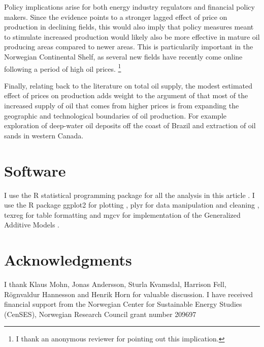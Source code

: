 \documentclass[12pt]{article}
\begin{document}
Policy implications arise for both energy industry regulators and financial policy makers. Since the evidence points to a stronger lagged effect of price on production in declining fields, this would also imply that policy measures meant to stimulate increased production would likely also be more effective in mature oil producing areas compared to newer areas. This is particularily important in the Norwegian Continental Shelf, as several new fields have recently come online following a period of high oil prices. \footnote{I thank an anonymous reviewer for pointing out this implication.}

Finally, relating back to the literature on total oil supply, the modest estimated effect of prices on production adds weight to the argument of \citet{hamilton_oil_2012} that most of the increased supply of oil that comes from higher prices is from expanding the geographic and technological boundaries of oil production.  For example exploration of deep-water oil deposits off the coast of Brazil and extraction of oil sands in western Canada.

\FloatBarrier
\section{Software}
I use the R statistical programming package for all the analysis in this article \citep{r_core_team_r:_2013}.  I use the R package ggplot2 for plotting \citep{wickham_ggplot2:_2009}, plyr for data manipulation and cleaning \citep{wickham_split-apply-combine_2011}, texreg for table formatting \citep{leifeld_texreg:_2013} and mgcv for implementation of the Generalized Additive Models \citep{wood_fast_2011}.

\section{Acknowledgments}
I thank Klaus Mohn, Jonas Andersson, Sturla Kvamsdal, Harrison Fell, R\"ognvaldur Hannesson and Henrik Horn for valuable discussion. I have received financial support from the Norwegian Center for Sustainable Energy Studies (CenSES), Norwegian Research Council grant number 209697 

\begin{spacing}{1}


\end{spacing}
\end{document}

